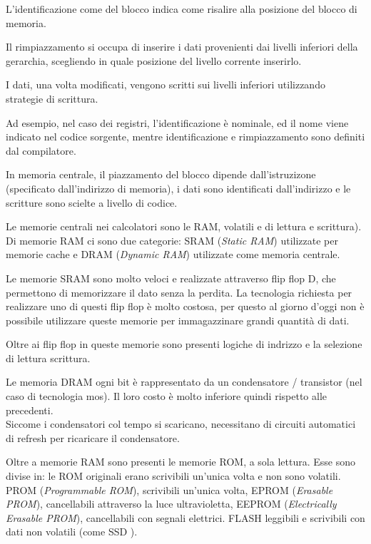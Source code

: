 \documentclass[../template]{subfiles}
\begin{document}
L'identificazione come del blocco indica come risalire alla posizione del blocco di memoria.

Il rimpiazzamento si occupa di inserire i dati provenienti dai livelli inferiori della gerarchia, scegliendo in quale posizione del livello corrente inserirlo.

I dati, una volta modificati, vengono scritti sui livelli inferiori utilizzando strategie di scrittura.


Ad esempio, nel caso dei registri, l'identificazione è nominale, ed il nome viene indicato nel codice sorgente, mentre identificazione e rimpiazzamento sono definiti dal compilatore.

In memoria centrale, il piazzamento del blocco dipende dall'istruzizone (specificato dall'indirizzo di memoria), i dati sono identificati dall'indirizzo e le scritture sono scielte a livello di codice.

Le memorie centrali nei calcolatori sono le RAM, volatili e di lettura e scrittura). Di memorie RAM ci sono due categorie:
SRAM (\textit{Static RAM}) utilizzate per memorie cache e DRAM (\textit{Dynamic RAM}) utilizzate come memoria centrale.

Le memorie SRAM sono molto veloci e realizzate attraverso flip flop D, che permettono di memorizzare il dato senza la perdita.
La tecnologia richiesta per realizzare uno di questi flip flop è molto costosa, per questo al giorno d'oggi non è possibile utilizzare queste memorie per immagazzinare grandi quantità di dati.

Oltre ai flip flop in queste memorie sono presenti logiche di indrizzo e la selezione di lettura scrittura.

Le memoria DRAM ogni bit è rappresentato da un condensatore / transistor (nel caso di tecnologia mos). Il loro costo è molto inferiore quindi rispetto alle precedenti.
\\
Siccome i condensatori col tempo si scaricano, necessitano di circuiti automatici di refresh per ricaricare il condensatore.

Oltre a memorie RAM sono presenti le memorie ROM, a sola lettura. Esse sono divise in:
le ROM originali erano scrivibili un'unica volta e non sono volatili.
PROM (\textit{Programmable ROM}), scrivibili un'unica volta,
EPROM (\textit{Erasable PROM}), cancellabili attraverso la luce ultravioletta,
EEPROM (\textit{Electrically Erasable PROM}), cancellabili con segnali elettrici.
FLASH leggibili e scrivibili con dati non volatili (come SSD ).
\end{document}
